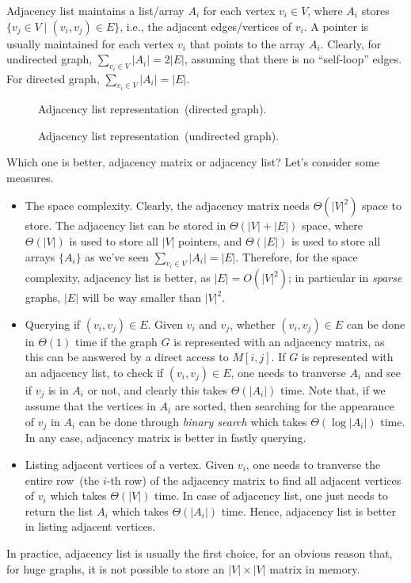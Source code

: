 Adjacency list maintains a list/array $A_i$ for each vertex $v_i \in V$, where
$A_i$ stores $\{v_j \in V \mid (v_i, v_j) \in E\}$, i.e., the adjacent edges/vertices of $v_i$.
A pointer is usually maintained for each vertex $v_i$ that points to the array $A_i$.
Clearly, for undirected graph, $\sum_{v_i \in V} |A_i| = 2|E|$, assuming that there is no ``self-loop'' edges.
For directed graph, $\sum_{v_i \in V} |A_i| = |E|$.

\begin{figure}[h!]
\centering{}
\caption{Adjacency list representation~(directed graph).}
\end{figure}

\begin{figure}[h!]
\centering{}
\caption{Adjacency list representation~(undirected graph).}
\end{figure}

Which one is better, adjacency matrix or adjacency list? 
Let's consider some measures.
\vspace*{-\topsep}
\begin{itemize}
\item The space complexity. Clearly, the adjacency matrix needs $\Theta(|V|^2)$ space to store.
The adjacency list can be stored in $\Theta(|V| + |E|)$ space, where $\Theta(|V|)$ is used to
store all $|V|$ pointers, and $\Theta(|E|)$ is used to store all arrays $\{A_i\}$ as we've seen
$\sum_{v_i\in V} |A_i| = |E|$. Therefore, for the space complexity, adjacency list is better,
as $|E| = O(|V|^2)$; in particular in \emph{sparse} graphs, $|E|$ will be way smaller than $|V|^2$.

\item Querying if $(v_i,v_j)\in E$. Given $v_i$ and $v_j$, whether $(v_i,v_j)\in E$ can be done
in $\Theta(1)$ time if the graph $G$ is represented with an adjacency matrix, as this can be answered
by a direct access to $M[i,j]$.
If $G$ is represented with an adjacency list, to check if $(v_i,v_j)\in E$, one needs to tranverse
$A_i$ and see if $v_j$ is in $A_i$ or not, and clearly this takes $\Theta(|A_i|)$ time.
Note that, if we assume that the vertices in $A_i$ are sorted, then searching for the appearance of $v_j$
in $A_i$ can be done through \emph{binary search} which takes $\Theta(\log |A_i|)$ time.
In any case, adjacency matrix is better in fastly querying.

\item Listing adjacent vertices of a vertex. Given $v_i$, one needs to tranverse the entire row~(the $i$-th row) of the adjacency matrix
to find all adjacent vertices of $v_i$ which takes $\Theta(|V|)$ time.
In case of adjacency list, one just needs to return the list $A_i$ which takes $\Theta(|A_i|)$ time.
Hence, adjacency list is better in listing adjacent vertices.

\end{itemize}

In practice, adjacency list is usually the first choice, for an obvious reason that, for huge graphs, it is not possible
to store an $|V|\times |V|$ matrix in memory.
